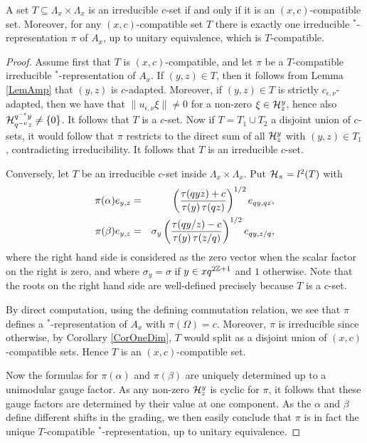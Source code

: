 \begin{Prop}\label{PropClassRep} A set $T\subseteq \Lambda_x\times \Lambda_x$ is an irreducible $c$-set if and only if it is an $(x,c)$-compatible set. Moreover, for any $(x,c)$-compatible set $T$ there is exactly one irreducible $^*$-representation $\pi$ of $A_x$, up to unitary equivalence, which is $T$-compatible.
\end{Prop}

\begin{proof} Assume first that $T$ is $(x,c)$-compatible, and let $\pi$ be a $T$-compatible irreducible $^*$-representation of $A_x$. If $(y,z)\in T$, then it follows from Lemma \ref{LemAmp} that $(y,z)$ is $c$-adapted. Moreover, if $(y,z)\in T$ is strictly $c_{\epsilon,\nu}$-adapted, then we have that $\|u_{\epsilon,\nu}\xi\|\neq 0$ for a non-zero $\xi\in \mathcal{H}^y_z$, hence also $\mathcal{H}^{q^{-\epsilon}y}_{q^{-\nu}z}\neq \{0\}$. It follows that $T$ is a $c$-set. Now if $T=T_1\cup T_2$ a disjoint union of $c$-sets, it would follow that $\pi$ restricts to the direct sum of all $\mathcal{H}^y_z$ with $(y,z)\in T_1$, contradicting irreducibility. It follows that $T$ is an irreducible $c$-set.

Conversely, let $T$ be an irreducible $c$-set inside $\Lambda_x\times \Lambda_x$. Put $\mathcal{H}_{\pi} = l^2(T)$ with \begin{eqnarray*} \pi(\alpha) e_{y,z} &=&  \left(\frac{\operatorname{\tau}(qyz)+c}{\operatorname{\tau}(y)\operatorname{\tau}(qz)}\right)^{1/2}e_{qy,qz},\\ \pi(\beta) e_{y,z} &=& \sigma_y\left(\frac{\operatorname{\tau}(qy/z)-c}{\operatorname{\tau}(y)\operatorname{\tau}(z/q)}\right)^{1/2} e_{qy,z/q},\end{eqnarray*} where the right hand side is considered as the zero vector when the scalar factor on the right is zero, and where $\sigma_y = \sigma$ if $y\in xq^{2\mathbb{Z}+1}$ and $1$ otherwise. Note that the roots on the right hand side are well-defined precisely because $T$ is a $c$-set. 

By direct computation, using the defining commutation relation, we see that $\pi$ defines a $^*$-representation of $A_x$ with $\pi(\Omega) =c$. Moreover, $\pi$ is irreducible since otherwise, by Corollary \ref{CorOneDim}, $T$ would split as a disjoint union of $(x,c)$-compatible sets. Hence $T$ is an $(x,c)$-compatible set.

Now the formulas for $\pi(\alpha)$ and $\pi(\beta)$ are uniquely determined up to a unimodular gauge factor. As any non-zero $\mathcal{H}^{y}_z$ is cyclic for $\pi$, it follows that these gauge factors are determined by their value at one component. As the $\alpha$ and $\beta$ define different shifts in the grading, we then easily conclude that $\pi$ is in fact the unique $T$-compatible $^*$-representation, up to unitary equivalence.
\end{proof}

